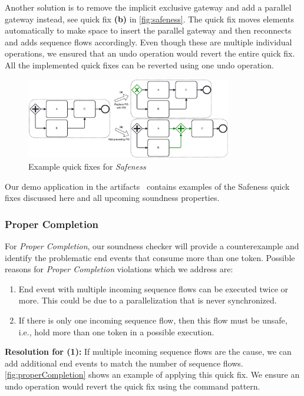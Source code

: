 \documentclass[runningheads]{llncs}
\begin{document}
Another solution is to remove the implicit exclusive gateway and add a parallel gateway instead, see quick fix \textbf{(b)} in \autoref{fig:safeness}.
The quick fix moves elements automatically to make space to insert the parallel gateway and then reconnects and adds sequence flows accordingly.
Even though these are multiple individual operations, we ensured that an undo operation would revert the entire quick fix.
All the implemented quick fixes can be reverted using one undo operation.

\begin{figure}[ht]
	\centering
	\includegraphics[width=0.8\textwidth]{images/safeness}
	\caption{Example quick fixes for \textit{Safeness}}
	\label{fig:safeness}
\end{figure}

Our demo application in the artifacts~\cite{noauthorgivenBPM2024Artifacts2024} contains examples of the Safeness quick fixes discussed here and all upcoming soundness properties.

\subsubsection{Proper Completion}
For \textit{Proper Completion}, our soundness checker will provide a counterexample and identify the problematic end events that consume more than one token.
Possible reasons for \textit{Proper Completion} violations which we address are:

\begin{enumerate}
	\item End event with multiple incoming sequence flows can be executed twice or more.
	This could be due to a parallelization that is never synchronized.
	\item If there is only one incoming sequence flow, then this flow must be unsafe, i.e., hold more than one token in a possible execution.
\end{enumerate}

\textbf{Resolution for (1):} If multiple incoming sequence flows are the cause, we can add additional end events to match the number of sequence flows.
\autoref{fig:properCompletion} shows an example of applying this quick fix.
We ensure an undo operation would revert the quick fix using the command pattern.
\end{document}
